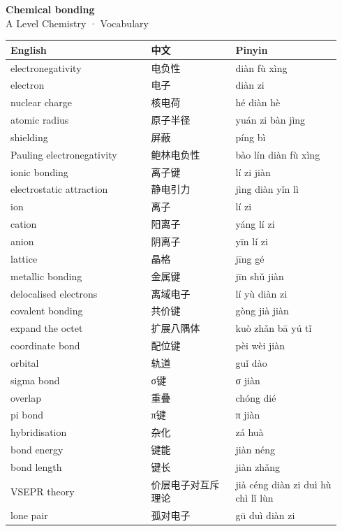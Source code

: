 \documentclass[11pt]{article}
\begin{document}
\begin{center}
  {\LARGE\bfseries Chemical bonding}\\[0.35em]
  {\large A Level Chemistry · Vocabulary}
\end{center}
\vspace{0.6em}

\begin{longtable}{@{}p{0.40\linewidth}p{0.24\linewidth}p{0.30\linewidth}@{}}
\toprule
\textbf{English} & \textbf{中文} & \textbf{Pinyin} \\
\midrule
\endhead
\bottomrule
\endlastfoot
electronegativity & 电负性 & diàn fù xìng \\
electron & 电子 & diàn zi \\
nuclear charge & 核电荷 & hé diàn hè \\
atomic radius & 原子半径 & yuán zi bàn jìng \\
shielding & 屏蔽 & píng bì \\
Pauling electronegativity & 鲍林电负性 & bào lín diàn fù xìng \\
ionic bonding & 离子键 & lí zi jiàn \\
electrostatic attraction & 静电引力 & jìng diàn yǐn lì \\
ion & 离子 & lí zi \\
cation & 阳离子 & yáng lí zi \\
anion & 阴离子 & yīn lí zi \\
lattice & 晶格 & jīng gé \\
metallic bonding & 金属键 & jīn shǔ jiàn \\
delocalised electrons & 离域电子 & lí yù diàn zi \\
covalent bonding & 共价键 & gòng jià jiàn \\
expand the octet & 扩展八隅体 & kuò zhǎn bā yú tǐ \\
coordinate bond & 配位键 & pèi wèi jiàn \\
orbital & 轨道 & guǐ dào \\
sigma bond & σ键 & σ jiàn \\
overlap & 重叠 & chóng dié \\
pi bond & π键 & π jiàn \\
hybridisation & 杂化 & zá huà \\
bond energy & 键能 & jiàn néng \\
bond length & 键长 & jiàn zhǎng \\
VSEPR theory & 价层电子对互斥理论 & jià céng diàn zi duì hù chì lǐ lùn \\
lone pair & 孤对电子 & gū duì diàn zi \\

\end{longtable}
\end{document}
